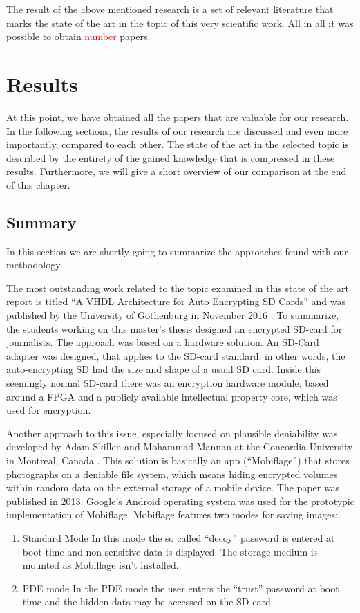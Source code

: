\documentclass[12pt,a4paper,titlepage,oneside]{scrartcl}
\newcommand\todo[1]{\textcolor{red}{#1}}
\begin{document}
The result of the above mentioned research is a set of relevant literature that marks the state of the art in the topic of this very scientific work.
All in all it was possible to obtain \todo{number} papers.

\newpage
\section{Results}
At this point, we have obtained all the papers that are valuable for our research.
In the following sections, the results of our research are discussed and even more importantly, compared to each other.
The state of the art in the selected topic is described by the entirety of the gained knowledge that is compressed in these results.
Furthermore, we will give a short overview of our comparison at the end of this chapter.

\subsection{Summary}
In this section we are shortly going to summarize the approaches found with our methodology.

The most outstanding work related to the topic examined in this state of the art report is titled ``A VHDL Architecture for Auto Encrypting SD Cards'' and was published by the University of Gothenburg in November 2016 \cite{Davidsson2016}.
To summarize, the students working on this master's thesis designed an encrypted SD-card for journalists.
The approach was based on a hardware solution.
An SD-Card adapter was designed, that applies to the SD-card standard, in other words, the auto-encrypting SD had the size and shape of a usual SD card.
Inside this seemingly normal SD-card there was an encryption hardware module, based around a FPGA and a publicly available intellectual property core, which was used for encryption.

Another approach to this issue, especially focused on plausible deniability was developed by Adam Skillen and Mohammad Mannan at the Concordia University in Montreal, Canada \cite{skillen2013implementing}.
This solution is basically an app (``Mobiflage'') that stores photographs on a deniable file system, which means hiding encrypted volumes within random data on the external storage of a mobile device.
The paper was published in 2013.
Google's Android operating system was used for the prototypic implementation of Mobiflage.
Mobiflage features two modes for saving images: 
\begin{enumerate}
  \item Standard Mode
  In this mode the so called ``decoy'' password is entered at boot time and non-sensitive data is displayed.
  The storage medium is mounted as Mobiflage isn't installed.
  \item PDE mode
  In the PDE mode the user enters the ``trust'' password at boot time and the hidden data may be accessed on the SD-card.
\end{enumerate}
\end{document}
